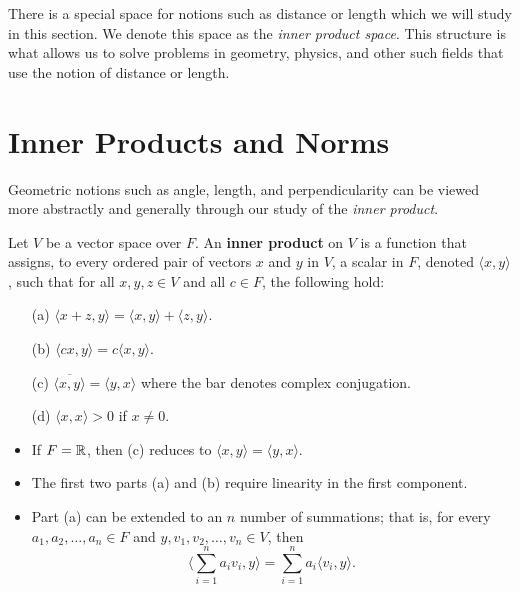 
There is a special space for notions such as distance or length which we will study in this section. We denote this space as the \textit{inner product space}. This structure is what allows us to solve problems in geometry, physics, and other such fields that use the notion of distance or length.  


\section{Inner Products and Norms}

Geometric notions such as angle, length, and perpendicularity can be viewed more abstractly and generally through our study of the \textit{inner product}.

\begin{definition}
    Let \( V  \) be a vector space over \( F  \). An \textbf{inner product} on \( V  \) is a function that assigns, to every ordered pair of vectors \( x \) and \( y  \) in \( V  \), a scalar in \( F  \), denoted \(\langle x,y \rangle\), such that for all \( x,y,z \in V  \) and all \( c \in F  \), the following hold:
    \begin{enumerate}
        \item[(a)] \( \langle x + z , y  \rangle = \langle x,y  \rangle + \langle  z,y  \rangle  \). 
        \item[(b)] \( \langle cx, y \rangle = c \langle x,y  \rangle \).
        \item[(c)] \( \overline{\langle x,y \rangle} = \langle y,x \rangle \) where the bar denotes complex conjugation.
        \item[(d)] \( \langle x,x \rangle > 0  \) if \( x \neq  0  \). 
    \end{enumerate}
\end{definition}

\begin{itemize}
    \item If \( F = \mathbb{R}  \), then (c) reduces to \( \langle x,y  \rangle = \langle  y , x  \rangle  \).
    \item The first two parts (a) and (b) require linearity in the first component.
    \item Part (a) can be extended to an \( n \) number of summations; that is, for every \( {a}_{1}, {a}_{2}, \dots, {a}_{n} \in F  \) and \( y, {v}_{1}, {v}_{2}, \dots, {v}_{n} \in V  \), then 
        \[  \Big\langle \sum_{ i=1 }^{ n } {a}_{i} {v}_{i}, y   \Big\rangle = \sum_{ i=1 }^{n} {a}_{i} \langle {v}_{i}, y \rangle.  \]
\end{itemize}

